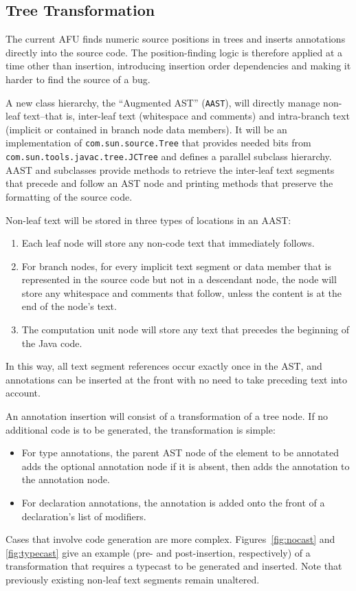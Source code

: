 \documentclass{article}
\begin{document}
\subsection{Tree Transformation}

The current AFU finds numeric source positions in trees and inserts
annotations directly into the source code.  The position-finding logic
is therefore applied at a time other than insertion, introducing
insertion order dependencies and making it harder to find the source of
a bug.

A new class hierarchy, the ``Augmented AST'' (\texttt{AAST}), will
directly manage non-leaf text--that is, inter-leaf text (whitespace and
comments) and intra-branch text (implicit or contained in branch node
data members).  It will be an implementation of
\texttt{com.sun.source.Tree} that provides needed bits from
\texttt{com.sun.tools.javac.tree.JCTree} and defines a parallel subclass
hierarchy.  AAST and subclasses provide methods to retrieve the
inter-leaf text segments that precede and follow an AST node and
printing methods that preserve the formatting of the source code.

Non-leaf text will be stored in three types of locations in an AAST:
\begin{enumerate}
\item  Each leaf node will store any non-code text that immediately
follows.
\item  For branch nodes, for every implicit text segment or data member
that is represented in the source code but not in a descendant node, the
node will store any whitespace and comments that follow, unless the
content is at the end of the node's text.
\item  The computation unit node will store any text that precedes the
beginning of the Java code.
\end{enumerate}
In this way, all text segment references occur exactly once in the AST,
and annotations can be inserted at the front with no need to take
preceding text into account.

An annotation insertion will consist of a transformation of a tree node.
If no additional code is to be generated, the transformation is simple:
\begin{itemize}
\item  For type annotations, the parent AST node of the element to be
annotated adds the optional annotation node if it is absent, then adds
the annotation to the annotation node.
\item  For declaration annotations, the annotation is added onto the
front of a declaration's list of modifiers.
\end{itemize}
Cases that involve code generation are more complex.
Figures~\ref{fig:nocast} and \ref{fig:typecast} give an example (pre-
and post-insertion, respectively) of a transformation that requires a
typecast to be generated and inserted.  Note that previously existing
non-leaf text segments remain unaltered.
\end{document}
